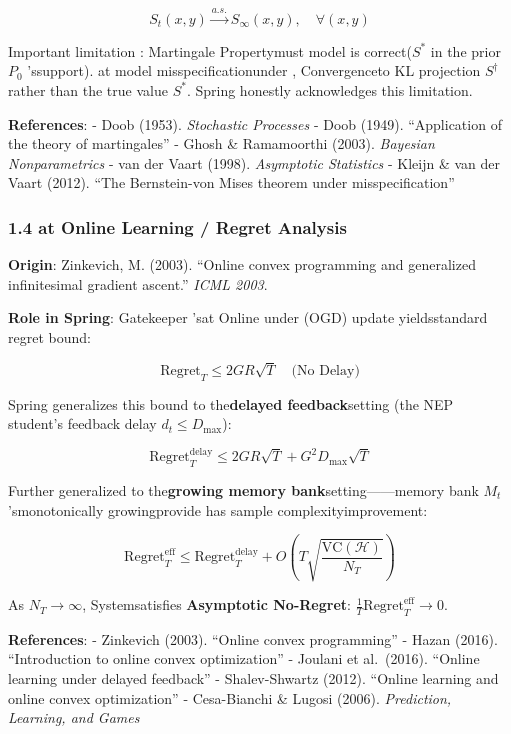\documentclass[
  12pt,
]{article}
\begin{document}
\[S_t(x,y) \xrightarrow{a.s.} S_\infty(x,y), \quad \forall (x,y)\]

Important limitation : Martingale Propertymust model is correct(\(S^*\) in the prior \(P_0\)
'ssupport). at model misspecificationunder , Convergenceto  KL projection \(S^\dagger\) rather than the true value
\(S^*\). Spring honestly acknowledges this limitation.

\textbf{References}: - Doob (1953). \emph{Stochastic Processes} - Doob
(1949). ``Application of the theory of martingales'' - Ghosh \&
Ramamoorthi (2003). \emph{Bayesian Nonparametrics} - van der Vaart
(1998). \emph{Asymptotic Statistics} - Kleijn \& van der Vaart (2012).
``The Bernstein-von Mises theorem under misspecification''

\subsubsection{1.4 at Online Learning /
Regret Analysis}\label{ux5728ux7ebfux5b66ux4e60-ux9057ux61beux5206ux6790}

\textbf{Origin}: Zinkevich, M. (2003). ``Online convex programming and
generalized infinitesimal gradient ascent.'' \emph{ICML 2003}.

\textbf{Role in Spring}: Gatekeeper 'sat Online under  (OGD)
update yieldsstandard regret bound: 

\[\text{Regret}_T \leq 2GR\sqrt{T} \quad \text{(No Delay)}\]

Spring generalizes this bound to the\textbf{delayed feedback}setting (the NEP student's feedback delay
\(d_t \leq D_{\max}\)):

\[\text{Regret}_T^{\text{delay}} \leq 2GR\sqrt{T} + G^2 D_{\max} \sqrt{T}\]

Further generalized to the\textbf{growing memory bank}setting------memory bank \(M_t\)
'smonotonically growingprovide has sample complexityimprovement: 

\[\text{Regret}_T^{\text{eff}} \leq \text{Regret}_T^{\text{delay}} + O\left(T \sqrt{\frac{\text{VC}(\mathcal{H})}{N_T}}\right)\]

As
\(N_T \to \infty\), Systemsatisfies \textbf{Asymptotic No-Regret}: \(\frac{1}{T}\text{Regret}_T^{\text{eff}} \to 0\). 

\textbf{References}: - Zinkevich (2003). ``Online convex programming'' -
Hazan (2016). ``Introduction to online convex optimization'' - Joulani
et al.~(2016). ``Online learning under delayed feedback'' -
Shalev-Shwartz (2012). ``Online learning and online convex
optimization'' - Cesa-Bianchi \& Lugosi (2006). \emph{Prediction,
Learning, and Games}
\end{document}
